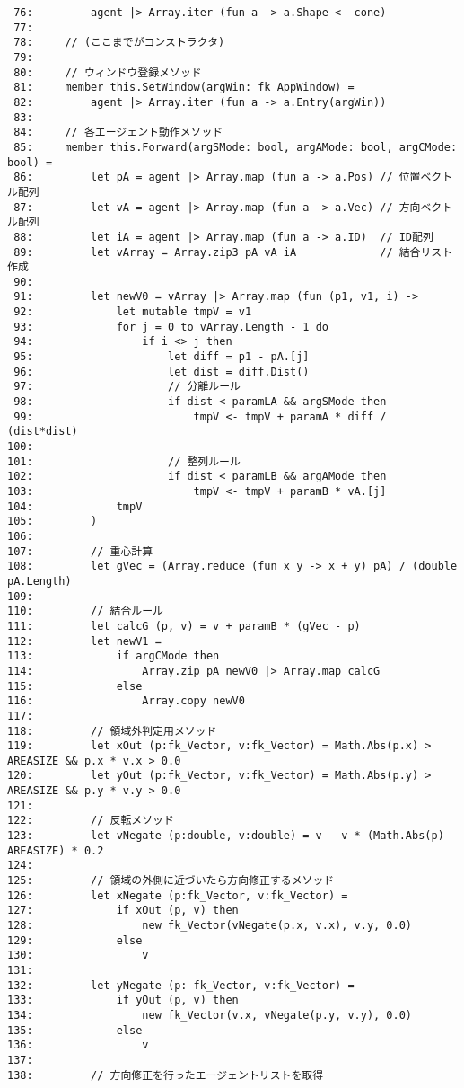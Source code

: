 \begin{breakbox}
\begin{small}
\begin{verbatim}
 76:         agent |> Array.iter (fun a -> a.Shape <- cone)
 77: 
 78:     // (ここまでがコンストラクタ)
 79: 
 80:     // ウィンドウ登録メソッド
 81:     member this.SetWindow(argWin: fk_AppWindow) =
 82:         agent |> Array.iter (fun a -> a.Entry(argWin))
 83: 
 84:     // 各エージェント動作メソッド
 85:     member this.Forward(argSMode: bool, argAMode: bool, argCMode: bool) =
 86:         let pA = agent |> Array.map (fun a -> a.Pos) // 位置ベクトル配列
 87:         let vA = agent |> Array.map (fun a -> a.Vec) // 方向ベクトル配列
 88:         let iA = agent |> Array.map (fun a -> a.ID)  // ID配列
 89:         let vArray = Array.zip3 pA vA iA             // 結合リスト作成
 90: 
 91:         let newV0 = vArray |> Array.map (fun (p1, v1, i) ->
 92:             let mutable tmpV = v1
 93:             for j = 0 to vArray.Length - 1 do
 94:                 if i <> j then
 95:                     let diff = p1 - pA.[j]
 96:                     let dist = diff.Dist()
 97:                     // 分離ルール
 98:                     if dist < paramLA && argSMode then
 99:                         tmpV <- tmpV + paramA * diff / (dist*dist)
100: 
101:                     // 整列ルール
102:                     if dist < paramLB && argAMode then
103:                         tmpV <- tmpV + paramB * vA.[j]
104:             tmpV
105:         )
106: 
107:         // 重心計算
108:         let gVec = (Array.reduce (fun x y -> x + y) pA) / (double pA.Length)
109: 
110:         // 結合ルール
111:         let calcG (p, v) = v + paramB * (gVec - p)
112:         let newV1 =
113:             if argCMode then
114:                 Array.zip pA newV0 |> Array.map calcG
115:             else
116:                 Array.copy newV0
117: 
118:         // 領域外判定用メソッド
119:         let xOut (p:fk_Vector, v:fk_Vector) = Math.Abs(p.x) > AREASIZE && p.x * v.x > 0.0
120:         let yOut (p:fk_Vector, v:fk_Vector) = Math.Abs(p.y) > AREASIZE && p.y * v.y > 0.0
121: 
122:         // 反転メソッド
123:         let vNegate (p:double, v:double) = v - v * (Math.Abs(p) - AREASIZE) * 0.2
124: 
125:         // 領域の外側に近づいたら方向修正するメソッド
126:         let xNegate (p:fk_Vector, v:fk_Vector) =
127:             if xOut (p, v) then
128:                 new fk_Vector(vNegate(p.x, v.x), v.y, 0.0)
129:             else
130:                 v
131: 
132:         let yNegate (p: fk_Vector, v:fk_Vector) =
133:             if yOut (p, v) then
134:                 new fk_Vector(v.x, vNegate(p.y, v.y), 0.0)
135:             else
136:                 v
137: 
138:         // 方向修正を行ったエージェントリストを取得

\end{verbatim}
\end{small}
\end{breakbox}

